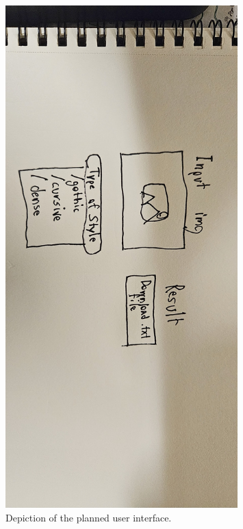 \documentclass[12pt]{article}
\begin{document}
	\begin{figure}[htbp]
        \centering
		\includegraphics[width=0.8\textwidth]{./jp.jpeg}
        \caption{Depiction of the planned user interface.}
        \label{fig:myfigure1}
    \end{figure}
\newpage
\end{document}

